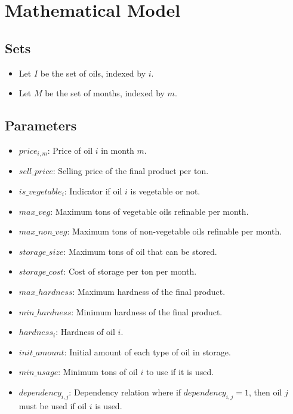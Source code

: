 \documentclass{article}
\begin{document}
\section*{Mathematical Model}

\subsection*{Sets}
\begin{itemize}
    \item Let \( I \) be the set of oils, indexed by \( i \).
    \item Let \( M \) be the set of months, indexed by \( m \).
\end{itemize}

\subsection*{Parameters}
\begin{itemize}
    \item \( price_{i,m} \): Price of oil \( i \) in month \( m \).
    \item \( sell\_price \): Selling price of the final product per ton.
    \item \( is\_vegetable_{i} \): Indicator if oil \( i \) is vegetable or not.
    \item \( max\_veg \): Maximum tons of vegetable oils refinable per month.
    \item \( max\_non\_veg \): Maximum tons of non-vegetable oils refinable per month.
    \item \( storage\_size \): Maximum tons of oil that can be stored.
    \item \( storage\_cost \): Cost of storage per ton per month.
    \item \( max\_hardness \): Maximum hardness of the final product.
    \item \( min\_hardness \): Minimum hardness of the final product.
    \item \( hardness_{i} \): Hardness of oil \( i \).
    \item \( init\_amount \): Initial amount of each type of oil in storage.
    \item \( min\_usage \): Minimum tons of oil \( i \) to use if it is used.
    \item \( dependency_{i,j} \): Dependency relation where if \( dependency_{i,j} = 1 \), then oil \( j \) must be used if oil \( i \) is used.
\end{itemize}
\end{document}
